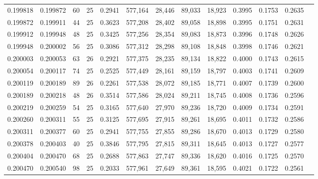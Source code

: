 \begin{tabular}{rrrrrrrrrrrrr}
0.199818 & 0.199872 &  60 &  25 &                                     0.2941 & 577,164 &  28,446 &  89,033 &  18,923 & 0.3995 & 0.1753 & 0.2635 \\
0.199872 & 0.199911 &  44 &  25 &                                     0.3623 & 577,208 &  28,402 &  89,058 &  18,898 & 0.3995 & 0.1751 & 0.2631 \\
0.199912 & 0.199948 &  48 &  25 &                                     0.3425 & 577,256 &  28,354 &  89,083 &  18,873 & 0.3996 & 0.1748 & 0.2626 \\
0.199948 & 0.200002 &  56 &  25 &                                     0.3086 & 577,312 &  28,298 &  89,108 &  18,848 & 0.3998 & 0.1746 & 0.2621 \\
0.200003 & 0.200053 &  63 &  26 &                                     0.2921 & 577,375 &  28,235 &  89,134 &  18,822 & 0.4000 & 0.1743 & 0.2615 \\
0.200054 & 0.200117 &  74 &  25 &                                     0.2525 & 577,449 &  28,161 &  89,159 &  18,797 & 0.4003 & 0.1741 & 0.2609 \\
0.200119 & 0.200189 &  89 &  26 &                                     0.2261 & 577,538 &  28,072 &  89,185 &  18,771 & 0.4007 & 0.1739 & 0.2600 \\
0.200189 & 0.200218 &  48 &  26 &                                     0.3514 & 577,586 &  28,024 &  89,211 &  18,745 & 0.4008 & 0.1736 & 0.2596 \\
0.200219 & 0.200259 &  54 &  25 &                                     0.3165 & 577,640 &  27,970 &  89,236 &  18,720 & 0.4009 & 0.1734 & 0.2591 \\
0.200260 & 0.200311 &  55 &  25 &                                     0.3125 & 577,695 &  27,915 &  89,261 &  18,695 & 0.4011 & 0.1732 & 0.2586 \\
0.200311 & 0.200377 &  60 &  25 &                                     0.2941 & 577,755 &  27,855 &  89,286 &  18,670 & 0.4013 & 0.1729 & 0.2580 \\
0.200378 & 0.200403 &  40 &  25 &                                     0.3846 & 577,795 &  27,815 &  89,311 &  18,645 & 0.4013 & 0.1727 & 0.2577 \\
0.200404 & 0.200470 &  68 &  25 &                                     0.2688 & 577,863 &  27,747 &  89,336 &  18,620 & 0.4016 & 0.1725 & 0.2570 \\
0.200470 & 0.200540 &  98 &  25 &                                     0.2033 & 577,961 &  27,649 &  89,361 &  18,595 & 0.4021 & 0.1722 & 0.2561 \\

\end{tabular}
